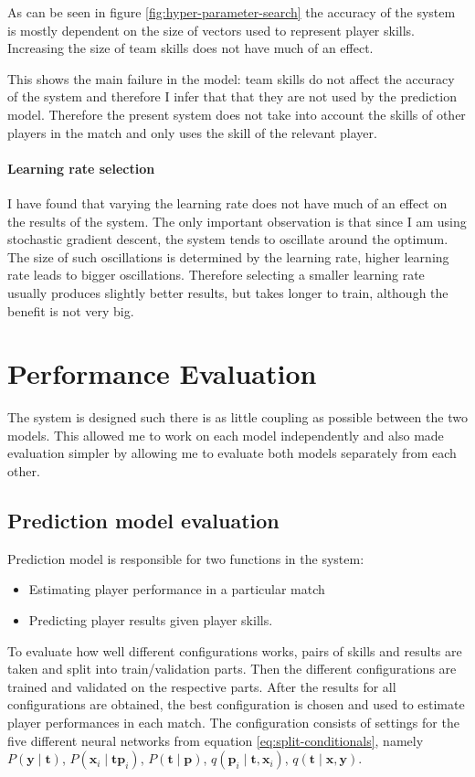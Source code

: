 \documentclass[12pt,a4paper]{book}
\newcommand\bs[1]{\boldsymbol{#1}}
\begin{document}
As can be seen in figure \ref{fig:hyper-parameter-search} the accuracy of the system is mostly dependent on the size of vectors used to represent player skills.
Increasing the size of team skills does not have much of an effect.

This shows the main failure in the model: team skills do not affect the accuracy of the system and therefore I infer that that they are not used by the prediction model.
Therefore the present system does not take into account the skills of other players in the match and only uses the skill of the relevant player.

\paragraph{Learning rate selection}
I have found that varying the learning rate does not have much of an effect on the results of the system.
The only important observation is that since I am using stochastic gradient descent, the system tends to oscillate around the optimum.
The size of such oscillations is determined by the learning rate, higher learning rate leads to bigger oscillations.
Therefore selecting a smaller learning rate usually produces slightly better results, but takes longer to train, although the benefit is not very big.

\section{Performance Evaluation}
The system is designed such there is as little coupling as possible between the two models.
This allowed me to work on each model independently and also made evaluation simpler by allowing me to evaluate both models separately from each other.
\subsection{Prediction model evaluation}
Prediction model is responsible for two functions in the system:
\begin{itemize}
\item Estimating player performance in a particular match
\item Predicting player results given player skills.
\end{itemize}

To evaluate how well different configurations works, pairs of skills and results are taken and split into train/validation parts.
Then the different configurations are trained and validated on the respective parts.
After the results for all configurations are obtained, the best configuration is chosen and used to estimate player performances in each match.
The configuration consists of settings for the five different neural networks from equation \ref{eq:split-conditionals}, namely 
$P(\bs{y}\mid\bs{t})$, $P(\bs{x}_i \mid \bs{t} \bs{p}_i)$, $P(\bs{t} \mid \bs{p})$, $q(\bs{p}_i \mid \bs{t},\bs{x}_i)$, $q(\bs{t}\mid\bs{x},\bs{y})$.
\end{document}

